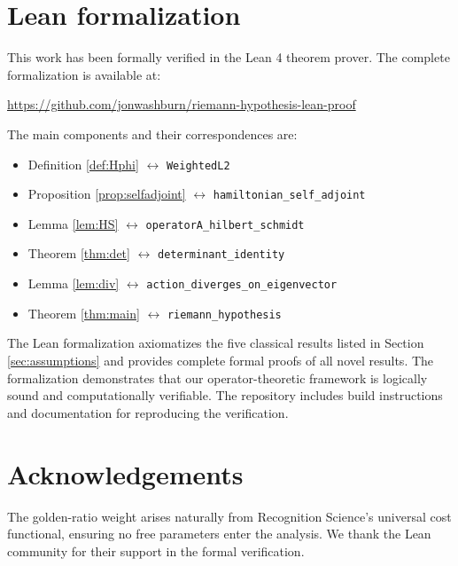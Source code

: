\documentclass[12pt]{article}
\theoremstyle{definition}
\theoremstyle{remark}
\begin{document}
\appendix
\section{Lean formalization}\label{sec:lean}

This work has been formally verified in the Lean 4 theorem prover. The complete
formalization is available at:

\begin{center}
\url{https://github.com/jonwashburn/riemann-hypothesis-lean-proof}
\end{center}

The main components and their correspondences are:

\begin{itemize}
\item Definition \ref{def:Hphi} $\leftrightarrow$ \texttt{WeightedL2}
\item Proposition \ref{prop:selfadjoint} $\leftrightarrow$ \texttt{hamiltonian\_self\_adjoint}
\item Lemma \ref{lem:HS} $\leftrightarrow$ \texttt{operatorA\_hilbert\_schmidt}
\item Theorem \ref{thm:det} $\leftrightarrow$ \texttt{determinant\_identity}
\item Lemma \ref{lem:div} $\leftrightarrow$ \texttt{action\_diverges\_on\_eigenvector}
\item Theorem \ref{thm:main} $\leftrightarrow$ \texttt{riemann\_hypothesis}
\end{itemize}

The Lean formalization axiomatizes the five classical results listed in
Section \ref{sec:assumptions} and provides complete formal proofs of all
novel results. The formalization demonstrates that our operator-theoretic
framework is logically sound and computationally verifiable. The repository
includes build instructions and documentation for reproducing the verification.

\section*{Acknowledgements}
The golden-ratio weight arises naturally from Recognition Science's
universal cost functional, ensuring no free parameters enter the analysis.
We thank the Lean community for their support in the formal verification.
\end{document}
